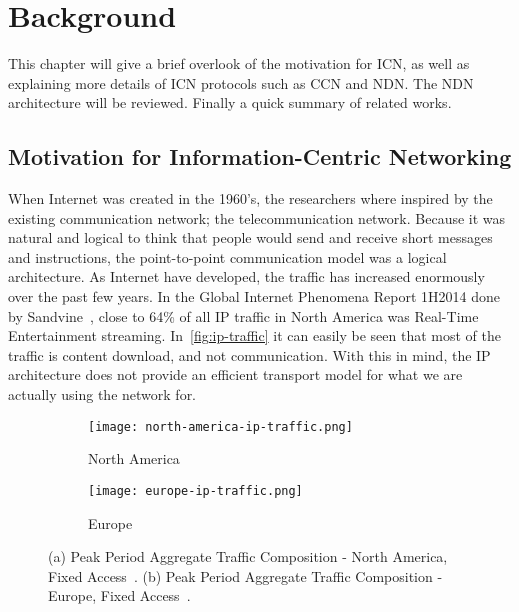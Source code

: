 \chapter{Background}\label{chp:background} 

This chapter will give a brief overlook of the motivation for \gls{ICN},
as well as explaining more details of \gls{ICN} protocols such as \gls{CCN} and \gls{NDN}.
The \gls{NDN} architecture will be reviewed.
Finally a quick summary of related works.

\section{Motivation for Information-Centric Networking}
When Internet was created in the 1960's, the researchers where inspired by the existing communication network; the telecommunication network.
Because it was natural and logical to think that people would send and receive short messages and instructions, the point-to-point communication model was a logical architecture. 
As Internet have developed, the traffic has increased enormously over the past few years. 
In the Global Internet Phenomena Report 1H2014 done by Sandvine~\cite{gipr2014}, close to 64\% of all \gls{IP} traffic in North America was Real-Time Entertainment streaming.
In~\autoref{fig:ip-traffic} it can easily be seen that most of the traffic is content download, and not communication.
With this in mind, the \gls{IP} architecture does not provide an efficient transport model for what we are actually using the network for.

\begin{figure}[ht]
  \centering
  \begin{subfigure}{0.5\textwidth}
    \centering
    \texttt{[image: north-america-ip-traffic.png]}
    \caption{North America}
    \label{fig:north-america-ip-traffic}
  \end{subfigure}%
  \begin{subfigure}{0.5\textwidth}
    \centering
    \texttt{[image: europe-ip-traffic.png]}
    \caption{Europe}
    \label{fig:europe-ip-traffic}
  \end{subfigure}
  \caption{
  (a) Peak Period Aggregate Traffic Composition - North America, Fixed Access~\cite{gipr2014}.
  (b) Peak Period Aggregate Traffic Composition - Europe, Fixed Access~\cite{gipr2014}.
  }
  \label{fig:ip-traffic}
\end{figure}

